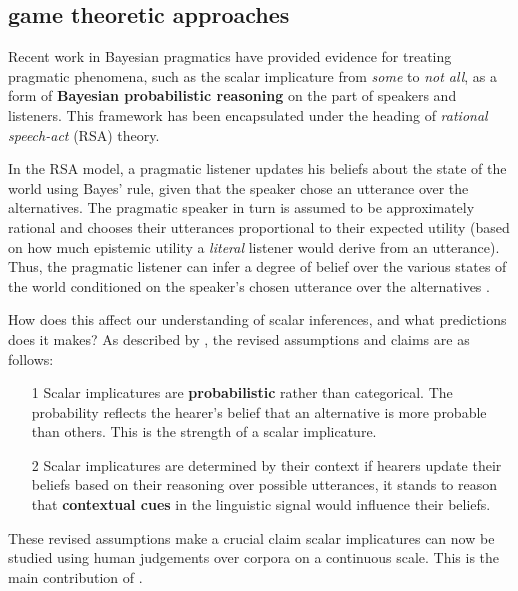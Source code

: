 \documentclass[10pt, biblatex]{report}
\begin{document}
\subsection{game theoretic approaches}

Recent work in Bayesian pragmatics \citep{frank_predicting_2012,
lassiter_context_2013, rothschild2013game, goodman_pragmatic_2016} have provided
evidence for treating pragmatic phenomena, such as the scalar implicature from
\textit{some} to \textit{not all}, as a form of \textbf{Bayesian probabilistic
reasoning} on the part of speakers and listeners. This framework has been
encapsulated under the heading of \textit{rational speech-act} (RSA) theory.

In the RSA model, a pragmatic listener updates his beliefs about the state of
the world using Bayes' rule, given that the speaker chose an utterance over the
alternatives. The pragmatic speaker in turn is assumed to be approximately
rational and chooses their utterances proportional to their expected utility
(based on how much epistemic utility a \textit{literal} listener would derive
from an utterance). Thus, the pragmatic listener can infer a degree of belief
over the various states of the world conditioned on the speaker's chosen
utterance over the alternatives \citep{goodman_knowledge_2013,goodman_pragmatic_2016}.

How does this affect our understanding of scalar inferences, and what predictions
does it makes? As described by \citeauthor{degen_investigating_2015}, the
revised assumptions and claims are as follows:

\begin{enumerate}
    \item[1] Scalar implicatures are \textbf{probabilistic} rather than
             categorical. The probability reflects the hearer's belief that
             an alternative is more probable than others. This is the strength
             of a scalar implicature.
    \item[2] Scalar implicatures are determined by their context \dash if
             hearers update their beliefs based on their reasoning over
             possible utterances, it stands to reason that \textbf{contextual cues}
             in the linguistic signal would influence their beliefs.
\end{enumerate}

These revised assumptions make a crucial claim \dash scalar implicatures can
now be studied using human judgements over corpora on a continuous scale. This
is the main contribution of \citet{degen_investigating_2015}.
\end{document}
